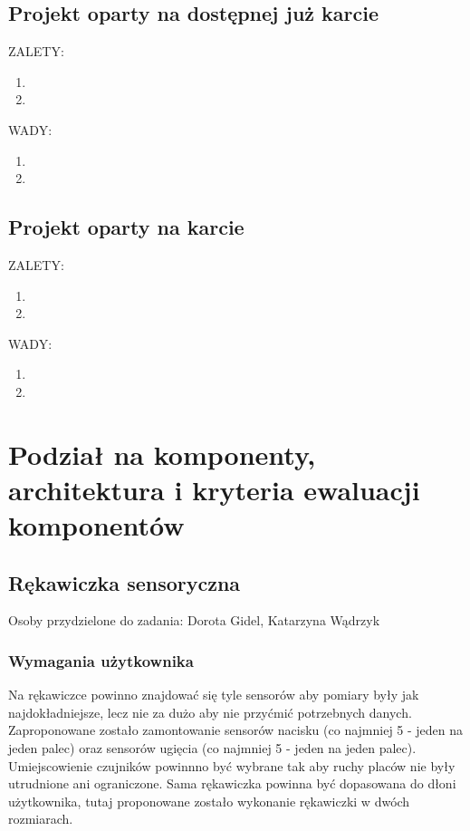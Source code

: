 \documentclass{article}
\begin{document}
\subsection{Projekt oparty na dostępnej już karcie }
ZALETY:\\
\begin{enumerate}
    \item
    \item
\end{enumerate}
WADY:\\
\begin{enumerate}
    \item
    \item
\end{enumerate}
\subsection{Projekt oparty na karcie }
ZALETY:\\
\begin{enumerate}
    \item
    \item
\end{enumerate}
WADY:\\
\begin{enumerate}
    \item
    \item
\end{enumerate}
\section{Podział na komponenty, architektura i kryteria ewaluacji komponentów}
\subsection{Rękawiczka sensoryczna}
Osoby przydzielone do zadania: Dorota Gidel, Katarzyna Wądrzyk
\subsubsection{Wymagania użytkownika}
Na rękawiczce powinno znajdować się tyle sensorów aby pomiary były jak najdokładniejsze, lecz nie za dużo aby nie przyćmić potrzebnych danych. Zaproponowane zostało zamontowanie sensorów nacisku (co najmniej 5 - jeden na jeden palec) oraz sensorów ugięcia (co najmniej 5 - jeden na jeden palec). Umiejscowienie czujników powinnno być wybrane tak aby ruchy placów nie były utrudnione ani ograniczone. Sama rękawiczka powinna być dopasowana do dłoni użytkownika, tutaj proponowane zostało wykonanie rękawiczki w dwóch rozmiarach.
\end{document}
